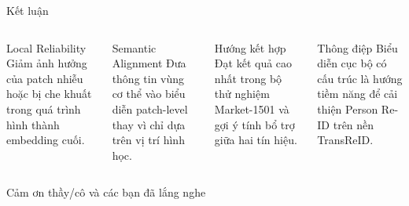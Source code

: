 \documentclass[aspectratio=169,10pt]{beamer}
\begin{document}
\begin{frame}{Kết luận}
  \begin{columns}[T,onlytextwidth]
    \begin{block}{Local Reliability}
      Giảm ảnh hưởng của patch nhiễu hoặc bị che khuất trong quá trình hình thành embedding cuối.
    \end{block}
    \begin{block}{Semantic Alignment}
      Đưa thông tin vùng cơ thể vào biểu diễn patch-level thay vì chỉ dựa trên vị trí hình học.
    \end{block}
    \begin{block}{Hướng kết hợp}
      Đạt kết quả cao nhất trong bộ thử nghiệm Market-1501 và gợi ý tính bổ trợ giữa hai tín hiệu.
    \end{block}
    \begin{block}{Thông điệp}
      Biểu diễn cục bộ có cấu trúc là hướng tiềm năng để cải thiện Person Re-ID trên nền TransReID.
    \end{block}
  \end{columns}
  \vspace{.16cm}
  \centering
  \Large Cảm ơn thầy/cô và các bạn đã lắng nghe
\end{frame}
\end{document}

